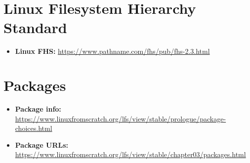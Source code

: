 \documentclass[10pt, a4paper, onecolumn, oneside, titlepage, openany]{book}
\begin{document}
\section{Linux Filesystem Hierarchy Standard}
\begin{itemize}
    \item \textbf{Linux FHS:} \url{https://www.pathname.com/fhs/pub/fhs-2.3.html}
\end{itemize}

\section{Packages}
\begin{itemize}
    \item \textbf{Package info:} \url{https://www.linuxfromscratch.org/lfs/view/stable/prologue/package-choices.html}
    \item \textbf{Package URLs:} \url{https://www.linuxfromscratch.org/lfs/view/stable/chapter03/packages.html}
\end{itemize}
\end{document}
